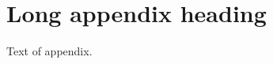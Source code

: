 
\chapter[Short appendix heading]{Long appendix heading} 
\label{ap:appendix2_label}

Text of appendix.





